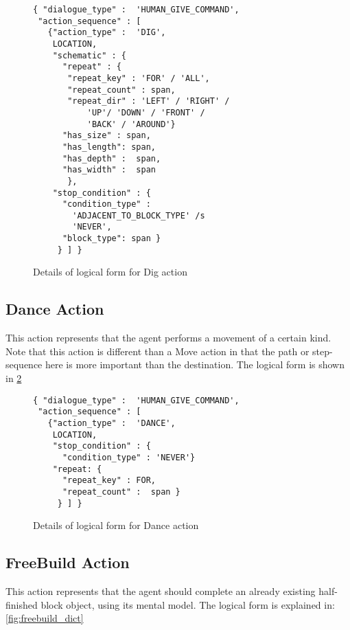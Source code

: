 \begin{figure}[ht]
    \centering
    \fontsize{8pt}{8pt}\selectfont
    \begin{verbatim}
{ "dialogue_type" :  'HUMAN_GIVE_COMMAND',
 "action_sequence" : [
   {"action_type" :  'DIG',
    LOCATION,
    "schematic" : {
      "repeat" : {
       "repeat_key" : 'FOR' / 'ALL',
       "repeat_count" : span,
       "repeat_dir" : 'LEFT' / 'RIGHT' /
           'UP'/ 'DOWN' / 'FRONT' / 
           'BACK' / 'AROUND'}
      "has_size" : span,
      "has_length": span,
      "has_depth" :  span,
      "has_width" :  span
       },
    "stop_condition" : {
      "condition_type" : 
        'ADJACENT_TO_BLOCK_TYPE' /s
        'NEVER',
      "block_type": span }
     } ] }
    \end{verbatim}
    \vspace{-20pt}
    \caption{Details of logical form  for Dig action}
    \vspace{-8pt}
    \label{fig:dig_dict}
\end{figure}


\subsection{Dance Action}
This action represents that the agent performs a movement of a certain kind. Note that this action is different than a Move action in that the path or step-sequence here is more important than the destination. The logical form is shown in \ref{fig:dance_dict}

\begin{figure}[ht]
    \centering
    \fontsize{8pt}{8pt}\selectfont
    \begin{verbatim}
{ "dialogue_type" :  'HUMAN_GIVE_COMMAND',
 "action_sequence" : [
   {"action_type" :  'DANCE',
    LOCATION,
    "stop_condition" : {
      "condition_type" : 'NEVER'}
    "repeat: {
      "repeat_key" : FOR,
      "repeat_count" :  span }
     } ] }
    \end{verbatim}
    \vspace{-20pt}
    \caption{Details of logical form for Dance action}
    \vspace{-8pt}
    \label{fig:dance_dict}
\end{figure}

\subsection{FreeBuild Action}
This action represents that the agent should complete an already existing half-finished block object, using its mental model. The logical form is explained in: \ref{fig:freebuild_dict}

